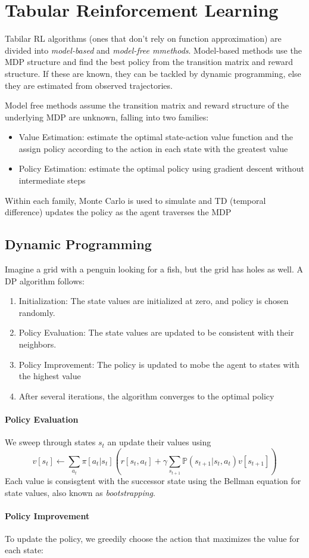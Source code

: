 \documentclass[11pt]{article}
\newcommand{\Pbb}{\mathbb{P}}
\begin{document}
\section{Tabular Reinforcement Learning}
Tabilar RL algorithms (ones that don't rely on function approximation) are divided into \emph{model-based} and \emph{model-free mmethods}. Model-based methods use the MDP structure and find the best policy from the transition matrix and reward structure. If these are known, they can be tackled by dynamic programming, else they are estimated from observed trajectories.

Model free methods assume the transition matrix and reward structure of the underlying MDP are unknown, falling into two families:
\begin{itemize}
    \item Value Estimation: estimate the optimal state-action value function and the assign policy according to the action in each state with the greatest value
    \item Policy Estimation: estimate the optimal policy using gradient descent without intermediate steps
\end{itemize}
Within each family, Monte Carlo is used to simulate and TD (temporal difference) updates the policy as the agent traverses the MDP

\subsection{Dynamic Programming}
Imagine a grid with a penguin looking for a fish, but the grid has holes as well. A DP algorithm follows:
\begin{enumerate}
    \item Initialization: The state values are initialized at zero, and policy is chosen randomly. 
    \item Policy Evaluation: The state values are updated to be consistent with their neighbors. 
    \item Policy Improvement: The policy is updated to mobe the agent to states with the highest value
    \item After several iterations, the algorithm converges to the optimal policy
\end{enumerate}

\paragraph{Policy Evaluation} We sweep through states $s_t$ an update their values using $$v[s_t] \leftarrow \sum_{a_t}\pi [a_t|s_t](r[s_t,a_t]+\gamma \sum_{s_{t+1}}\Pbb (s_{t+1}|s_t,a_t)v[s_{t+1}])$$
Each value is consisgtent with the successor state using the Bellman equation for state values, also known as \emph{bootstrapping}.

\paragraph{Policy Improvement} To update the policy, we greedily choose the action that maximizes the value for each state:
\end{document}
